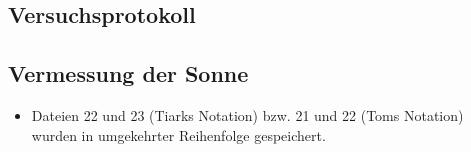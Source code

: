 \documentclass[../../main.tex]{subfiles}
\begin{document}
    \subsection*{Versuchsprotokoll} 

    \subsection*{Vermessung der Sonne}
    \begin{itemize}
        \item Dateien 22 und 23 (Tiarks Notation) bzw. 21 und 22 (Toms Notation) wurden in umgekehrter Reihenfolge gespeichert.
    \end{itemize}
\end{document}

